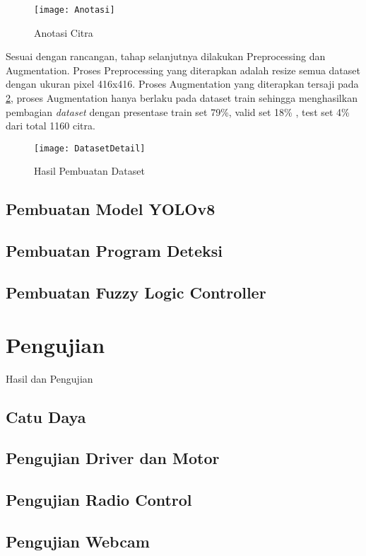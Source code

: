\begin{figure}[H]
	\centering
	\texttt{[image: Anotasi]}
	\caption{Anotasi Citra}
	\label{fig:anotasi}
\end{figure}

Sesuai dengan rancangan, tahap selanjutnya dilakukan Preprocessing dan Augmentation. Proses Preprocessing yang diterapkan adalah resize semua dataset dengan ukuran pixel 416x416. Proses Augmentation yang diterapkan tersaji pada \cref{fig:datasetdetail}, proses Augmentation hanya berlaku pada dataset train sehingga menghasilkan pembagian \textit{dataset} dengan presentase train set 79\%, valid set 18\% , test set 4\% dari total 1160 citra. 

\begin{figure}[H]
	\centering
	\texttt{[image: DatasetDetail]}
	\caption{Hasil Pembuatan Dataset}
	\label{fig:datasetdetail}
\end{figure}

\subsection{Pembuatan Model YOLOv8}
\subsection{Pembuatan Program Deteksi}
\subsection{Pembuatan Fuzzy Logic Controller}



\section{Pengujian}
Hasil dan Pengujian

\subsection{Catu Daya}
\subsection{Pengujian Driver dan Motor}
\subsection{Pengujian Radio Control}
\subsection{Pengujian Webcam}
